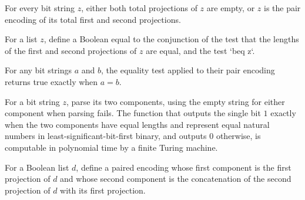 \begin{theorem}
\label{Complexity.BinArith.pair_cases}
\leanok
{}
For every bit string $z$, either both total projections of $z$ are empty, or $z$ is the
pair encoding of its total first and second projections.
\end{theorem}

\begin{definition}
\label{Complexity.BinArith.eqW}
\leanok
{}
For a list $z$, define a Boolean equal to the conjunction of the test that the lengths
of the first and second projections of $z$ are equal, and the test `beq z`.
\end{definition}

\begin{theorem}
\label{Complexity.BinArith.eqW_pairEncode}
\leanok
{}
For any bit strings $a$ and $b$, the equality test applied to their pair encoding
returns true exactly when $a=b$.
\end{theorem}

\begin{theorem}
\label{Complexity.BinArith.polyTimeComputable_eqW}
\leanok
{}
For a bit string $z$, parse its two components, using the empty string for either
component when parsing fails. The function that outputs the single bit $1$ exactly when
the two components have equal lengths and represent equal natural numbers in
least-significant-bit-first binary, and outputs $0$ otherwise, is computable in
polynomial time by a finite Turing machine.
\end{theorem}

\begin{definition}
\label{Complexity.BinArith.mulUStep}
\leanok
{}
For a Boolean list $d$, define a paired encoding whose first component is the first
projection of $d$ and whose second component is the concatenation of the second
projection of $d$ with its first projection.
\end{definition}

